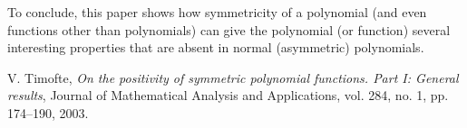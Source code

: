 \documentclass[12pt]{article}
\theoremstyle{definition}
\begin{document}
To conclude, this paper shows how symmetricity of a polynomial (and even functions other than polynomials) can give the polynomial (or function) several interesting properties that are absent in normal (asymmetric) polynomials.


\begin{thebibliography}{9}

V. Timofte,
\textit{On the positivity of symmetric polynomial functions. Part I: General results},
Journal of Mathematical Analysis and Applications,
vol. 284, no. 1, pp. 174--190, 2003.

\end{thebibliography}
\end{document}

